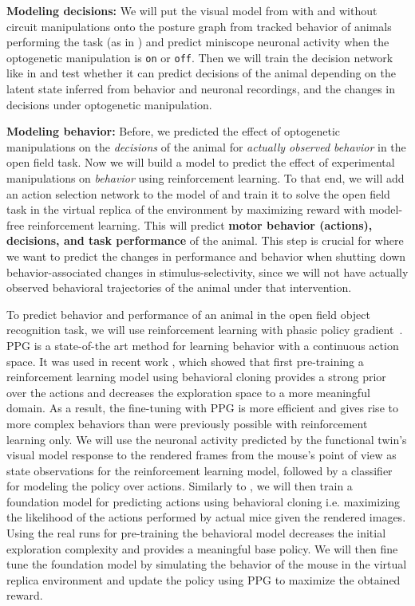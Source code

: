 \documentclass[B2,COG]{ercgrant}
\begin{document}
\textbf{Modeling decisions:} 
We will put the visual model from  with and without circuit manipulations onto the posture graph from tracked behavior of animals performing the task (as in ) and predict miniscope neuronal activity when the optogenetic manipulation is \texttt{on} or \texttt{off}. 
Then we will train the decision network like in  and test whether it can predict decisions of the animal depending on the latent state inferred from behavior and neuronal recordings, and the changes in decisions under optogenetic manipulation. 

\textbf{Modeling behavior:} 
Before, we predicted the effect of optogenetic manipulations on the \textit{decisions} of the animal for \textit{actually observed behavior} in the open field task. 
Now we will build a model to predict the effect of experimental manipulations on \textit{behavior} using reinforcement learning.
To that end, we will add an action selection network to the model of  and train it to solve the open field task in the virtual replica of the environment by maximizing reward with model-free reinforcement learning.
This will predict \textbf{motor behavior (actions), decisions, and task performance} of the animal. 
This step is crucial for  where we want to predict the changes in performance and behavior when shutting down behavior-associated changes in stimulus-selectivity, since we will not have actually observed behavioral trajectories of the animal under that intervention. 

To predict behavior and performance of an animal in the open field object recognition task, we will use reinforcement learning with phasic policy gradient~\parencite[PPG,][]{Cobbe2021-op}. 
PPG is a state-of-the art method for learning behavior with a continuous action space. 
It was used in recent work \cite{Baker2022-ph}, which showed that first pre-training a reinforcement learning model using behavioral cloning provides a strong prior over the actions and decreases the exploration space to a more meaningful domain. 
As a result, the fine-tuning with PPG is more efficient and gives rise to more complex behaviors than were previously possible with reinforcement learning only.
We will use the neuronal activity predicted by the functional twin's visual model response to the rendered frames from the mouse's point of view as state observations for the reinforcement learning model, followed by a classifier for modeling the policy over actions.
Similarly to \cite{Baker2022-ph}, we will then train a foundation model for predicting actions using behavioral cloning i.e. maximizing the likelihood of the actions performed by actual mice given the rendered images.
Using the real runs for pre-training the behavioral model decreases the initial exploration complexity and provides a meaningful base policy.
We will then fine tune the foundation model by simulating the behavior of the mouse in the virtual replica environment and update the policy using PPG to maximize the obtained reward.
\end{document}
